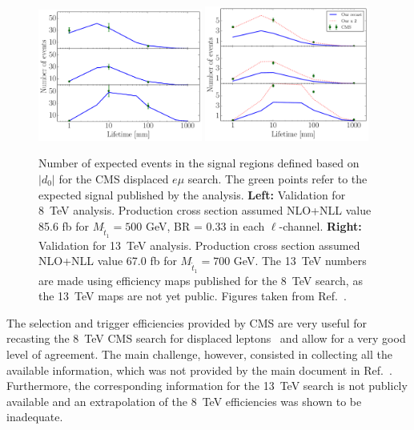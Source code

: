 \begin{figure}[ht]
\centering
\includegraphics[width=0.48\textwidth,angle=0]{ch5-figures/disp_lep_8tev.pdf}
\includegraphics[width=0.48\textwidth,angle=0]{ch5-figures/disp_lep_13tev.pdf}
\caption{\label{fig:ch5-valid1} Number of expected events in the signal regions defined based on $|d_0|$ for the CMS displaced $e\mu$ search. The green points refer to the expected signal published by the analysis. {\bf Left:} Validation for 8~TeV analysis. Production cross section assumed NLO+NLL value 85.6 fb for $M_{\tilde t_1} = 500$ GeV, BR = 0.33 in each $\ell$-channel. {\bf Right:} Validation for 13~TeV analysis. Production cross section assumed NLO+NLL value 67.0 fb for $M_{\tilde t_1} = 700$ GeV. The 13~TeV numbers are made using efficiency maps published for the 8~TeV search, as the 13~TeV maps are not yet public. Figures taken from Ref.~\cite{LesHouches2017}.}
\end{figure}

\vskip 0.1in
\vskip 0.1in

The selection and trigger efficiencies provided by CMS
are very useful for recasting the 8~TeV CMS search for
displaced leptons~\cite{Khachatryan:2014mea}
and allow for a very good level of agreement.
The main challenge, however, consisted in collecting all the available
information, which was not provided by the main document in
Ref.~\cite{Khachatryan:2014mea}.
Furthermore, the corresponding information for the 13~TeV search is
not publicly available and an extrapolation of the 8~TeV efficiencies
was shown to be inadequate.

